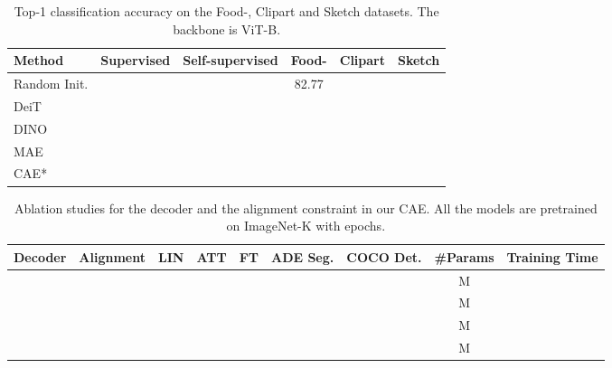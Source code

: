 \documentclass[twocolumn]{svjour3}          \smartqed  \usepackage{graphicx}
\newcommand{\cmark}{}
\newcommand{\xmarkg}{}
\def \ours {CAE*\xspace}
\begin{document}
\begin{table*}[t]
  \centering
  \caption{Top-1 classification accuracy on the Food-, Clipart and Sketch datasets. The backbone is ViT-B.}
  \setlength{\tabcolsep}{21pt}
\renewcommand{\arraystretch}{1.1}
        \begin{tabular}{l  c  c  c  c c }
            \toprule
            {Method} & {Supervised} & {Self-supervised} & Food- & Clipart  & Sketch \\
              \hline
              Random Init. &   \xmarkg &  \xmarkg & 82.77 &  &   \\
              DeiT & \cmark &  \xmarkg &  &  &   \\
              DINO &  \xmarkg & \cmark &  &   &     \\
              MAE & \xmarkg & \cmark &  &   &     \\
             \ours & \xmarkg & \cmark &  &   &  \\
            \bottomrule
        \end{tabular} 
        \label{tab:more_classification}
\end{table*}


\begin{table*}[t]
\caption{Ablation studies
for the decoder and the alignment constraint 
in our CAE. 
All the models are pretrained on ImageNet-K with  epochs.
}
\label{tab:ablation}
\setlength{\tabcolsep}{10pt}
\renewcommand{\arraystretch}{1.1}
\centering
\begin{tabular}{ccccccccc}
\toprule
 Decoder & Alignment & LIN & ATT & FT  &  ADE Seg.  &  COCO Det. & \#Params & Training Time \\
\midrule
 \xmarkg & \xmarkg &  &  &  &  &   &  M &  \\
 \cmark & \xmarkg &  &  &  &  &   &  M &  \\
 \xmarkg & \cmark &  &  &  &  &   &  M &  \\
 \cmark & \cmark &  &  &  &  &   &  M & \\
\bottomrule
\end{tabular} 
\end{table*} 
\end{document}

